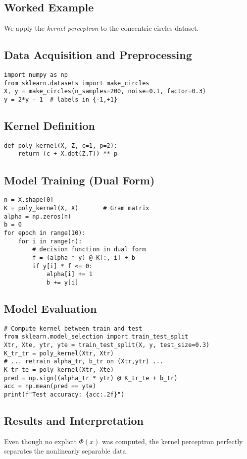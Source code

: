 \documentclass[11pt]{article}
\begin{document}
\subsection{Worked Example}
We apply the \emph{kernel perceptron} to the concentric‐circles dataset.

\subsection{Data Acquisition and Preprocessing}
\begin{lstlisting}
import numpy as np
from sklearn.datasets import make_circles
X, y = make_circles(n_samples=200, noise=0.1, factor=0.3)
y = 2*y - 1  # labels in {-1,+1}
\end{lstlisting}

\subsection{Kernel Definition}
\begin{lstlisting}
def poly_kernel(X, Z, c=1, p=2):
    return (c + X.dot(Z.T)) ** p
\end{lstlisting}

\subsection{Model Training (Dual Form)}
\begin{lstlisting}
n = X.shape[0]
K = poly_kernel(X, X)       # Gram matrix
alpha = np.zeros(n)
b = 0
for epoch in range(10):
    for i in range(n):
        # decision function in dual form
        f = (alpha * y) @ K[:, i] + b
        if y[i] * f <= 0:
            alpha[i] += 1
            b += y[i]
\end{lstlisting}

\subsection{Model Evaluation}
\begin{lstlisting}
# Compute kernel between train and test
from sklearn.model_selection import train_test_split
Xtr, Xte, ytr, yte = train_test_split(X, y, test_size=0.3)
K_tr_tr = poly_kernel(Xtr, Xtr)
# ... retrain alpha_tr, b_tr on (Xtr,ytr) ...
K_tr_te = poly_kernel(Xtr, Xte)
pred = np.sign((alpha_tr * ytr) @ K_tr_te + b_tr)
acc = np.mean(pred == yte)
print(f"Test accuracy: {acc:.2f}")
\end{lstlisting}

\subsection{Results and Interpretation}
Even though no explicit $\Phi(x)$ was computed, the kernel perceptron perfectly separates the nonlinearly separable data.
\end{document}
